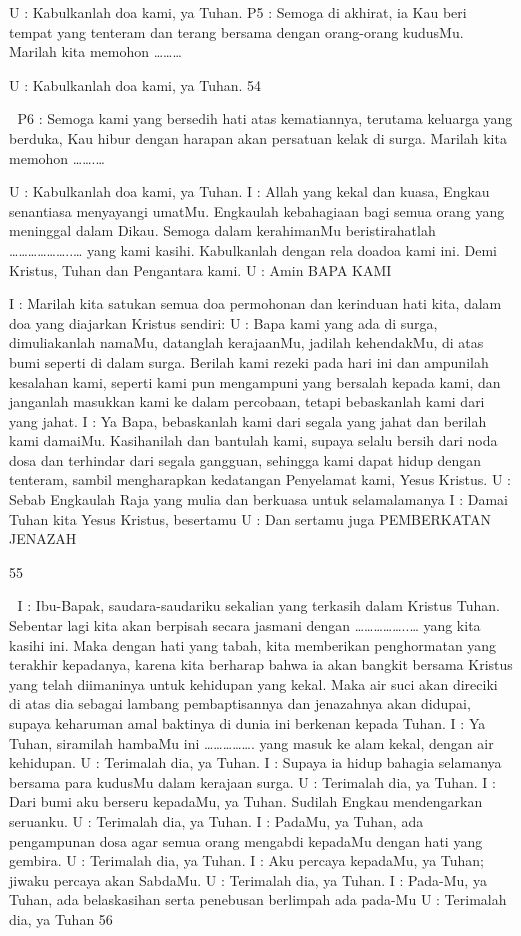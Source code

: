 \documentclass[10pt,a5paper,fancyhdr]{memoir}
\begin{document}
U : Kabulkanlah doa kami, ya Tuhan. 
P5 : Semoga di akhirat, ia Kau beri tempat yang tenteram dan terang 
bersama dengan orang-orang kudusMu. Marilah kita memohon 
……… 

U : Kabulkanlah doa kami, ya Tuhan. 
54 



P6 : Semoga kami yang bersedih hati atas kematiannya, terutama 
keluarga yang berduka, Kau hibur dengan harapan akan persatuan 
kelak di surga. Marilah kita memohon …….… 

U : Kabulkanlah doa kami, ya Tuhan. 
I : Allah yang kekal dan kuasa, Engkau senantiasa menyayangi 
umatMu. Engkaulah kebahagiaan bagi semua orang yang meninggal 
dalam Dikau. Semoga dalam kerahimanMu beristirahatlah 
………………..… yang kami kasihi. Kabulkanlah dengan rela doadoa 
kami ini. Demi Kristus, Tuhan dan Pengantara kami. 
U : Amin 
BAPA KAMI 

I : Marilah kita satukan semua doa permohonan dan kerinduan hati 
kita, dalam doa yang diajarkan Kristus sendiri: 
U : Bapa kami yang ada di surga, dimuliakanlah namaMu, datanglah 
kerajaanMu, jadilah kehendakMu, di atas bumi seperti di dalam 
surga. Berilah kami rezeki pada hari ini dan ampunilah kesalahan 
kami, seperti kami pun mengampuni yang bersalah kepada kami, dan 
janganlah masukkan kami ke dalam percobaan, tetapi bebaskanlah 
kami dari yang jahat. 
I : Ya Bapa, bebaskanlah kami dari segala yang jahat dan berilah 
kami damaiMu. Kasihanilah dan bantulah kami, supaya selalu bersih 
dari noda dosa dan terhindar dari segala gangguan, sehingga kami 
dapat hidup dengan tenteram, sambil mengharapkan kedatangan 
Penyelamat kami, Yesus Kristus. 
U : Sebab Engkaulah Raja yang mulia dan berkuasa untuk selamalamanya 
I : Damai Tuhan kita Yesus Kristus, besertamu 
U : Dan sertamu juga 
PEMBERKATAN JENAZAH 

55 



I : Ibu-Bapak, saudara-saudariku sekalian yang terkasih dalam 
Kristus Tuhan. Sebentar lagi kita akan berpisah secara jasmani 
dengan ……………..… yang kita kasihi ini. Maka dengan hati yang 
tabah, kita memberikan penghormatan yang terakhir kepadanya, 
karena kita berharap bahwa ia akan bangkit bersama Kristus yang 
telah diimaninya untuk kehidupan yang kekal. Maka air suci akan 
direciki di atas dia sebagai lambang pembaptisannya dan jenazahnya 
akan didupai, supaya keharuman amal baktinya di dunia ini berkenan 
kepada Tuhan. 
I : Ya Tuhan, siramilah hambaMu ini ……………. yang masuk ke 
alam kekal, dengan air kehidupan. 
U : Terimalah dia, ya Tuhan. 
I : Supaya ia hidup bahagia selamanya bersama para kudusMu dalam 
kerajaan surga. 
U : Terimalah dia, ya Tuhan. 
I : Dari bumi aku berseru kepadaMu, ya Tuhan. Sudilah Engkau 
mendengarkan seruanku. 
U : Terimalah dia, ya Tuhan. 
I : PadaMu, ya Tuhan, ada pengampunan dosa agar semua orang 
mengabdi kepadaMu dengan hati yang gembira. 
U : Terimalah dia, ya Tuhan. 
I : Aku percaya kepadaMu, ya Tuhan; jiwaku percaya akan 
SabdaMu. 
U : Terimalah dia, ya Tuhan. 
I : Pada-Mu, ya Tuhan, ada belaskasihan serta penebusan berlimpah 
ada pada-Mu 
U : Terimalah dia, ya Tuhan 
56 
\end{document}
